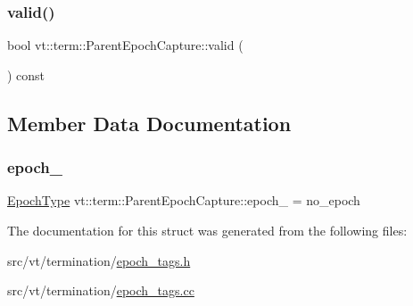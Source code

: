 \mbox{\label{structvt_1_1term_1_1_parent_epoch_capture_a756a8fa40a0e724ca7ea8b5d7a9a8b45}} 
\subsubsection{\texorpdfstring{valid()}{valid()}}
{\footnotesize\ttfamily bool vt\+::term\+::\+Parent\+Epoch\+Capture\+::valid (\begin{DoxyParamCaption}{ }\end{DoxyParamCaption}) const\hspace{0.3cm}{\ttfamily [inline]}}



\subsection{Member Data Documentation}
\mbox{\label{structvt_1_1term_1_1_parent_epoch_capture_a1d8ee50cac9b459aed1ec1295afa03ff}} 
\subsubsection{\texorpdfstring{epoch\+\_\+}{epoch\_}}
{\footnotesize\ttfamily \hyperlink{namespacevt_a81d11b28122d43bf9834577e4a06440f}{Epoch\+Type} vt\+::term\+::\+Parent\+Epoch\+Capture\+::epoch\+\_\+ = no\+\_\+epoch\hspace{0.3cm}{\ttfamily [private]}}



The documentation for this struct was generated from the following files\+:\begin{DoxyCompactItemize}
\item 
src/vt/termination/\hyperlink{epoch__tags_8h}{epoch\+\_\+tags.\+h}\item 
src/vt/termination/\hyperlink{epoch__tags_8cc}{epoch\+\_\+tags.\+cc}\end{DoxyCompactItemize}
